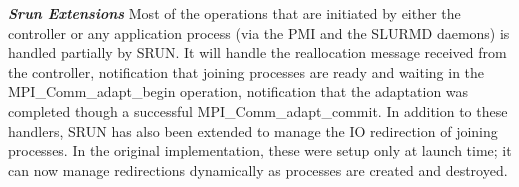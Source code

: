 \textbf{\textit{Srun Extensions}} Most of the operations that are initiated by either the controller or any application process (via the PMI and the SLURMD daemons) is handled partially by SRUN. It will handle the reallocation message received from the controller, notification that joining processes are ready and waiting in the MPI{\_}Comm{\_}adapt{\_}begin operation, notification that the adaptation was completed though a successful MPI{\_}Comm{\_}adapt{\_}commit. In addition to these handlers, SRUN has also been extended to manage the IO redirection of joining processes. In the original implementation, these were setup only at launch time; it can now manage redirections dynamically as processes are created and destroyed.
